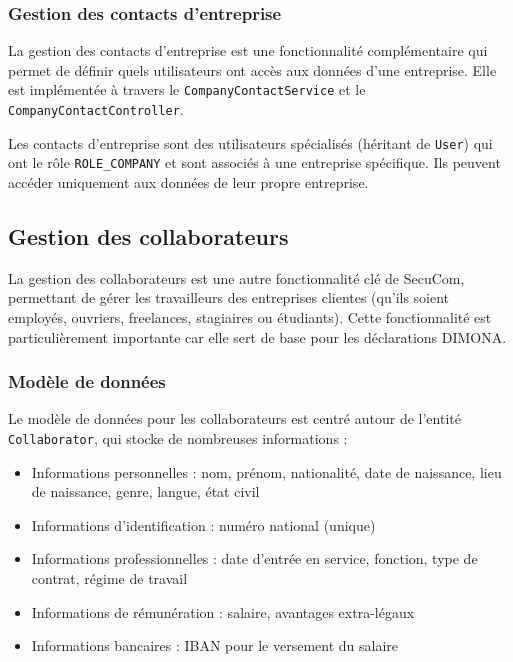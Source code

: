 \documentclass[12pt,a4paper]{report}
\begin{document}
\subsubsection{Gestion des contacts d'entreprise}

La gestion des contacts d'entreprise est une fonctionnalité complémentaire qui permet de définir quels utilisateurs ont accès aux données d'une entreprise. Elle est implémentée à travers le \texttt{CompanyContactService} et le \texttt{CompanyContactController}.

Les contacts d'entreprise sont des utilisateurs spécialisés (héritant de \texttt{User}) qui ont le rôle \texttt{ROLE\_COMPANY} et sont associés à une entreprise spécifique. Ils peuvent accéder uniquement aux données de leur propre entreprise.

\subsection{Gestion des collaborateurs}

La gestion des collaborateurs est une autre fonctionnalité clé de SecuCom, permettant de gérer les travailleurs des entreprises clientes (qu'ils soient employés, ouvriers, freelances, stagiaires ou étudiants). Cette fonctionnalité est particulièrement importante car elle sert de base pour les déclarations DIMONA.

\subsubsection{Modèle de données}

Le modèle de données pour les collaborateurs est centré autour de l'entité \texttt{Collaborator}, qui stocke de nombreuses informations :

\begin{itemize}
  \item Informations personnelles : nom, prénom, nationalité, date de naissance, lieu de naissance, genre, langue, état civil
  \item Informations d'identification : numéro national (unique)
  \item Informations professionnelles : date d'entrée en service, fonction, type de contrat, régime de travail
  \item Informations de rémunération : salaire, avantages extra-légaux
  \item Informations bancaires : IBAN pour le versement du salaire
\end{itemize}
\end{document}
